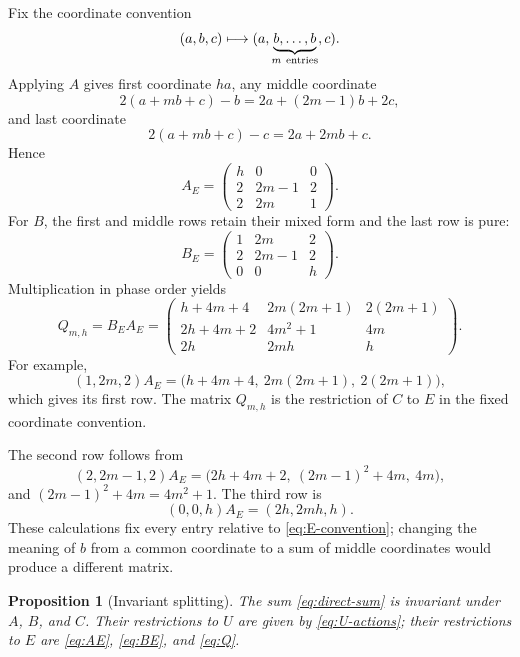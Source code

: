 \documentclass[11pt]{article}
\newtheorem{proposition}[theorem]{Proposition}
\theoremstyle{remark}
\numberwithin{equation}{section}
\begin{document}
Fix the coordinate convention
\begin{equation}\label{eq:E-convention}
(a,b,c)\longmapsto
(a,\underbrace{b,\ldots,b}_{m\ {\rm entries}},c).
\end{equation}
Applying \(A\) gives first coordinate \(ha\), any middle coordinate
\[
2(a+mb+c)-b=2a+(2m-1)b+2c,
\]
and last coordinate
\[
2(a+mb+c)-c=2a+2mb+c.
\]
Hence
\begin{equation}\label{eq:AE}
A_E=
\begin{pmatrix}
h&0&0\\
2&2m-1&2\\
2&2m&1
\end{pmatrix}.
\end{equation}
For \(B\), the first and middle rows retain their mixed form and the last
row is pure:
\begin{equation}\label{eq:BE}
B_E=
\begin{pmatrix}
1&2m&2\\
2&2m-1&2\\
0&0&h
\end{pmatrix}.
\end{equation}
Multiplication in phase order yields
\begin{equation}\label{eq:Q}
Q_{m,h}=B_EA_E=
\begin{pmatrix}
h+4m+4 & 2m(2m+1) & 2(2m+1)\\
2h+4m+2 & 4m^2+1 & 4m\\
2h & 2mh & h
\end{pmatrix}.
\end{equation}
For example,
\[
(1,2m,2)A_E
=\bigl(h+4m+4,\ 2m(2m+1),\ 2(2m+1)\bigr),
\]
which gives its first row.  The matrix \(Q_{m,h}\) is the restriction of
\(C\) to \(E\) in the fixed coordinate convention.

The second row follows from
\[
(2,2m-1,2)A_E
=\bigl(2h+4m+2,\ (2m-1)^2+4m,\ 4m\bigr),
\]
and \((2m-1)^2+4m=4m^2+1\).  The third row is
\[
(0,0,h)A_E=(2h,2mh,h).
\]
These calculations fix every entry relative to
\eqref{eq:E-convention}; changing the meaning of \(b\) from a common
coordinate to a sum of middle coordinates would produce a different matrix.

\begin{proposition}[Invariant splitting]\label{prop:splitting}
The sum \eqref{eq:direct-sum} is invariant under \(A\), \(B\), and \(C\).
Their restrictions to \(U\) are given by \eqref{eq:U-actions}; their
restrictions to \(E\) are \eqref{eq:AE}, \eqref{eq:BE}, and
\eqref{eq:Q}.
\end{proposition}
\end{document}
